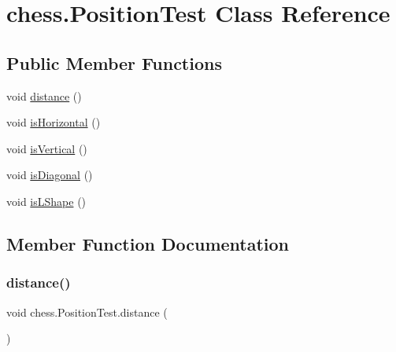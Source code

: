 \hypertarget{classchess_1_1_position_test}{}\section{chess.\+Position\+Test Class Reference}
\label{classchess_1_1_position_test}
\subsection*{Public Member Functions}
\begin{DoxyCompactItemize}
\item 
void \mbox{\hyperlink{classchess_1_1_position_test_ad2a84ad0971188ec8a54d915e45b1243}{distance}} ()
\item 
void \mbox{\hyperlink{classchess_1_1_position_test_aad10037e6fd3a768d9f62f6959df38d2}{is\+Horizontal}} ()
\item 
void \mbox{\hyperlink{classchess_1_1_position_test_af2a08be80ec38fa515c2fa0308184b40}{is\+Vertical}} ()
\item 
void \mbox{\hyperlink{classchess_1_1_position_test_a65523d90e0d4b8210fd77aafc8b0f751}{is\+Diagonal}} ()
\item 
void \mbox{\hyperlink{classchess_1_1_position_test_ad89a0615d380a654fe92366058f90e56}{is\+L\+Shape}} ()
\end{DoxyCompactItemize}


\subsection{Member Function Documentation}
\mbox{\label{classchess_1_1_position_test_ad2a84ad0971188ec8a54d915e45b1243}} 
\subsubsection{\texorpdfstring{distance()}{distance()}}
{\footnotesize\ttfamily void chess.\+Position\+Test.\+distance (\begin{DoxyParamCaption}{ }\end{DoxyParamCaption})}

\mbox{\label{classchess_1_1_position_test_a65523d90e0d4b8210fd77aafc8b0f751}} 
